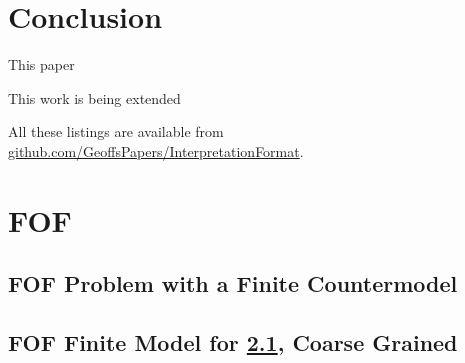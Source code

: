 \documentclass{easychair}
\begin{document}
      
\section{Conclusion}
\label{Conclusion}

This paper 

This work is being extended 



\newpage
\appendix

All these listings are available from
\href{https://github.com/GeoffsPapers/InterpretationFormat}{github.com/GeoffsPapers/InterpretationFormat}.

\section{FOF}
\label{FOF}

\subsection{FOF Problem with a Finite Countermodel}
\label{FOF_Finite.p}
\begin{small}

\end{small}

\newpage
\subsection{FOF Finite Model for \ref{FOF_Finite.p}, Coarse Grained}
\label{FOF_Finite.s}
\begin{small}

\end{small}
\end{document}
